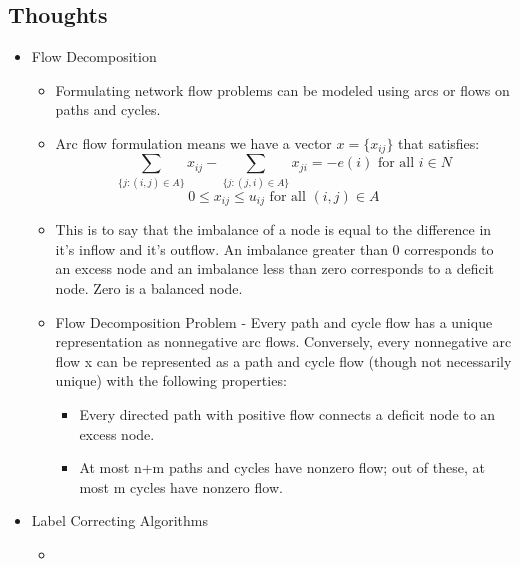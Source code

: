\documentclass{article}
\begin{document}
\subsection{Thoughts}
\begin{itemize}
    \item Flow Decomposition
    \begin{itemize}
        \item Formulating network flow problems can be modeled using arcs or flows on paths and cycles.
	\item Arc flow formulation means we have a vector $x=\{x_{ij}\}$ that satisfies:
		$$\sum_{\{j:(i,j) \in A\}} x_{ij} - \sum_{\{j:(j,i) \in A\}} x_{ji} = -e(i) \text{   for all } i \in N$$
		$$0 \leq x_{ij} \leq u_{ij} \text{   for all } (i,j) \in A$$
        \item This is to say that the imbalance of a node is equal to the difference in it's inflow and it's outflow.  An imbalance greater than 0 corresponds to an excess node and an imbalance less than zero corresponds to a deficit node.  Zero is a balanced node.
	\item Flow Decomposition Problem - Every path and cycle flow has a unique representation as nonnegative arc flows.  Conversely, every nonnegative arc flow x can be represented as a path and cycle flow (though not necessarily unique) with the following properties:
	\begin{itemize}
	    \item Every directed path with positive flow connects a deficit node to an excess node.
            \item At most n+m paths and cycles have nonzero flow; out of these, at most m cycles have nonzero flow.
	\end{itemize}
    \end{itemize}
    \item Label Correcting Algorithms
    \begin{itemize}
        \item 
    \end{itemize}
\end{itemize}
\end{document}
